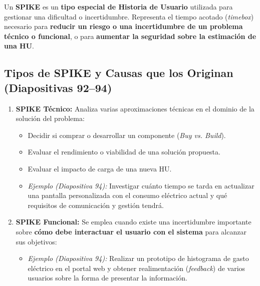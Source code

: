 \begin{definicion}[SPIKE]
Un \textbf{SPIKE} es un \textbf{tipo especial de Historia de Usuario} utilizada para gestionar una dificultad o incertidumbre. Representa el tiempo acotado (\textit{timebox}) necesario para \textbf{reducir un riesgo o una incertidumbre de un problema técnico o funcional}, o para \textbf{aumentar la seguridad sobre la estimación de una HU}.
\end{definicion}

\subsection{Tipos de SPIKE y Causas que los Originan (Diapositivas 92--94)}
\begin{enumerate}[label=\textbf{\arabic*.}, itemsep=3pt]
    \item \textbf{SPIKE Técnico:} Analiza varias aproximaciones técnicas en el dominio de la solución del problema:
    \begin{itemize}
        \item Decidir si comprar o desarrollar un componente (\textit{Buy vs. Build}).
        \item Evaluar el rendimiento o viabilidad de una solución propuesta.
        \item Evaluar el impacto de carga de una nueva HU.
        \item \textit{Ejemplo (Diapositiva 94):} Investigar cuánto tiempo se tarda en actualizar una pantalla personalizada con el consumo eléctrico actual y qué requisitos de comunicación y gestión tendrá.
    \end{itemize}
    \item \textbf{SPIKE Funcional:} Se emplea cuando existe una incertidumbre importante sobre \textbf{cómo debe interactuar el usuario con el sistema} para alcanzar sus objetivos:
    \begin{itemize}
        \item \textit{Ejemplo (Diapositiva 94):} Realizar un prototipo de histograma de gasto eléctrico en el portal web y obtener realimentación (\textit{feedback}) de varios usuarios sobre la forma de presentar la información.
    \end{itemize}
\end{enumerate}

